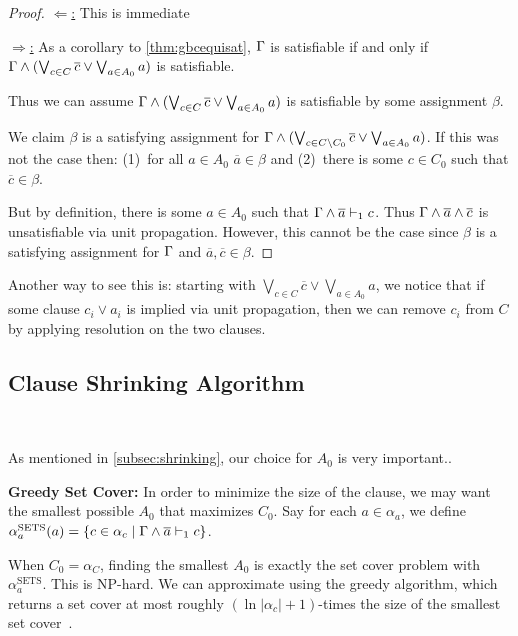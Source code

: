 \begin{proof}
    \underline{$\Leftarrow$:} This is immediate


    \underline{$\Rightarrow$:}  As a corollary to \autoref{thm:gbcequisat},
    $\Gamma$ is satisfiable if and only if $\Gamma \land (\bigvee_{c \in C}
    \overline{c} \lor \bigvee_{a \in A_0} a)$ is satisfiable.

    Thus we can assume $\Gamma \land (\bigvee_{c \in C} \overline{c} \lor
    \bigvee_{a \in A_0} a)$ is satisfiable by some assignment
    $\beta$.

    We claim $\beta$ is a satisfying assignment for $\Gamma \land (\bigvee_{c \in
    C \backslash C_0} \overline{c} \lor \bigvee_{a \in A_0} a)$. If this was not
    the case then: (1)~for all $a \in A_0$ $\overline{a} \in \beta$ and (2)~there
    is some $c \in C_0$ such that $\overline{c} \in \beta$. 

    But by definition, there is some $a \in A_0$ such that
    $\Gamma \land \overline{a} \vdash_1 c$. Thus $\Gamma \land \overline{a} \land
    \overline{c}$ is unsatisfiable via unit propagation. However, this cannot be
    the case since $\beta$ is a satisfying assignment for $\Gamma$ and
    $\overline{a}, \overline{c} \in \beta$.
\end{proof}

Another way to see this is: starting with $\bigvee_{c \in C} \overline{c} \lor
\bigvee_{a \in A_0} a$, we notice that if some clause $c_i \lor a_i$ is implied
via unit propagation, then we can remove $c_i$ from $C$ by applying resolution
on the two clauses.

\subsection{Clause Shrinking Algorithm}~\label{subsec:sym}

As mentioned in \autoref{subsec:shrinking}, our choice for $A_0$ is very important.. 


\noindent \textbf{Greedy Set Cover:} %
In order to minimize the size of the clause, we may want the smallest possible $A_0$ that maximizes $C_0$. Say for each $a \in \alpha_a$, we define $\alpha_a^\mathrm{SETS}(a) = \{ c \in \alpha_c \; | \; \Gamma \land \overline{a} \vdash_1 c\}$. 

When $C_0 = \alpha_C$, finding the smallest $A_0$ is exactly the set cover problem with $\alpha_a^\mathrm{SETS}$. This is NP-hard. We can approximate using the greedy algorithm, which returns a set cover at most roughly $(\ln |\alpha_c| + 1)$-times the size of the smallest set cover~\cite{greedysetcover}. 



